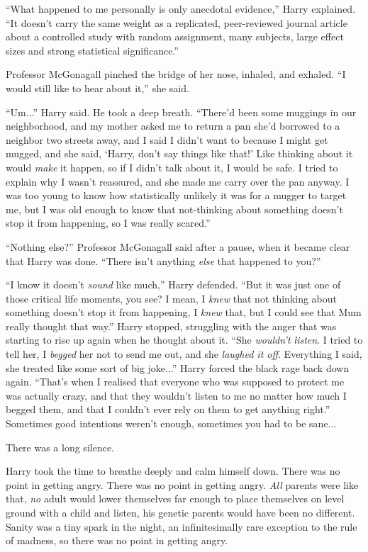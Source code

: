 ``What happened to me personally is only anecdotal evidence,'' Harry explained. ``It doesn't carry the same weight as a replicated, peer-reviewed journal article about a controlled study with random assignment, many subjects, large effect sizes and strong statistical significance.''

Professor McGonagall pinched the bridge of her nose, inhaled, and exhaled. ``I would still like to hear about it,'' she said.

``Um...'' Harry said. He took a deep breath. ``There'd been some muggings in our neighborhood, and my mother asked me to return a pan she'd borrowed to a neighbor two streets away, and I said I didn't want to because I might get mugged, and she said, `Harry, don't say things like that!' Like thinking about it would \emph{make} it happen, so if I didn't talk about it, I would be safe. I tried to explain why I wasn't reassured, and she made me carry over the pan anyway. I was too young to know how statistically unlikely it was for a mugger to target me, but I was old enough to know that not-thinking about something doesn't stop it from happening, so I was really scared.''

``Nothing else?'' Professor McGonagall said after a pause, when it became clear that Harry was done. ``There isn't anything \emph{else} that happened to you?''

``I know it doesn't \emph{sound} like much,'' Harry defended. ``But it was just one of those critical life moments, you see? I mean, I \emph{knew} that not thinking about something doesn't stop it from happening, I \emph{knew} that, but I could see that Mum really thought that way.'' Harry stopped, struggling with the anger that was starting to rise up again when he thought about it. ``She \emph{wouldn't listen}. I tried to tell her, I \emph{begged} her not to send me out, and she \emph{laughed it off}. Everything I said, she treated like some sort of big joke...'' Harry forced the black rage back down again. ``That's when I realised that everyone who was supposed to protect me was actually crazy, and that they wouldn't listen to me no matter how much I begged them, and that I couldn't ever rely on them to get anything right.'' Sometimes good intentions weren't enough, sometimes you had to be sane...

There was a long silence.

Harry took the time to breathe deeply and calm himself down. There was no point in getting angry. There was no point in getting angry. \emph{All} parents were like that, \emph{no} adult would lower themselves far enough to place themselves on level ground with a child and listen, his genetic parents would have been no different. Sanity was a tiny spark in the night, an infinitesimally rare exception to the rule of madness, so there was no point in getting angry.

